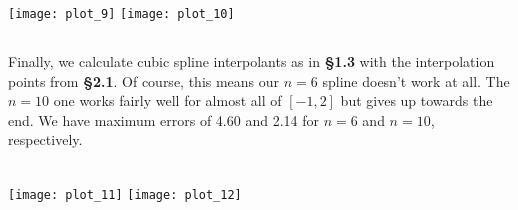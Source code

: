 \documentclass[11pt, oneside]{article}
\begin{document}
\texttt{[image: plot\_9]}
\texttt{[image: plot\_10]}

\subsection{}

Finally, we calculate cubic spline interpolants as in \textbf{\S1.3} with the interpolation points from \textbf{\S2.1}. Of course, this means our $n = 6$ spline doesn't work at all. The $n = 10$ one works fairly well for almost all of $[-1, 2]$ but gives up towards the end. We have maximum errors of 4.60 and 2.14 for $n = 6$ and $n = 10$, respectively. 

~\\

\texttt{[image: plot\_11]}
\texttt{[image: plot\_12]}
\end{document}
